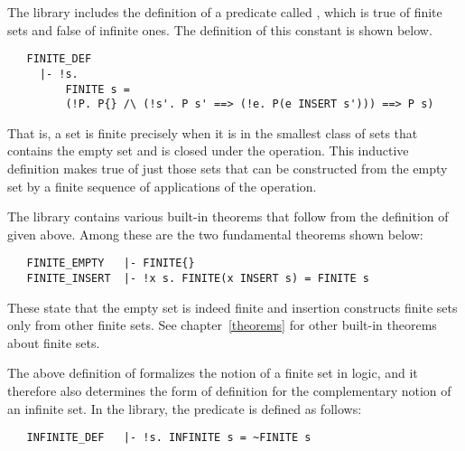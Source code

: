 The  library includes the definition of a predicate called
, which is true of finite sets and false of infinite ones.  The
definition of this constant is shown below.

\begin{hol}
\begin{verbatim}
   FINITE_DEF
     |- !s.
         FINITE s =
         (!P. P{} /\ (!s'. P s' ==> (!e. P(e INSERT s'))) ==> P s)
\end{verbatim}\end{hol}

\noindent That is, a set  is finite precisely when it is in the smallest
class of sets that contains the empty set and is closed under the 
operation.  This inductive definition makes  true of just those sets
that can be constructed from the empty set by a finite sequence of applications
of the  operation.

The  library contains various built-in theorems that follow from
the definition of  given above.  Among these are the two fundamental
theorems shown below:

\begin{hol}
\begin{verbatim}
   FINITE_EMPTY   |- FINITE{}
   FINITE_INSERT  |- !x s. FINITE(x INSERT s) = FINITE s
\end{verbatim}\end{hol}

\noindent These state that the empty set is indeed finite and insertion
constructs finite sets only from other finite sets. See chapter~\ref{theorems}
for other built-in theorems about finite sets.

The above definition of  formalizes the notion of a finite set in
logic, and it therefore also determines the form of definition for the
complementary notion of an infinite set. In the  library, the
predicate  is defined as follows:

\begin{hol}
\begin{verbatim}
   INFINITE_DEF   |- !s. INFINITE s = ~FINITE s
\end{verbatim}\end{hol}

